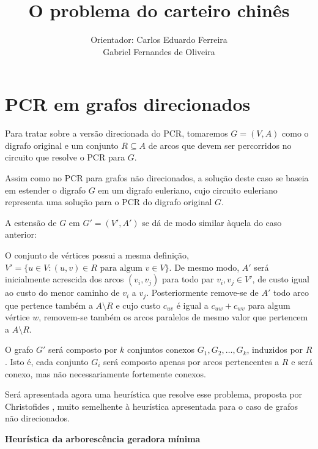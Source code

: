 \documentclass[12pt, a4paper]{article}
\title{O problema do carteiro chinês}
\author{Orientador: Carlos Eduardo Ferreira\\Gabriel Fernandes de Oliveira}
\date{}
\begin{document}
        \section{PCR em grafos direcionados}

        Para tratar sobre a versão direcionada do PCR, tomaremos $G = (V, A)$ como o digrafo original e um conjunto $R \subseteq A$ de arcos que devem ser percorridos no circuito que resolve o PCR para $G$.

        Assim como no PCR para grafos não direcionados, a solução deste caso se baseia em estender o digrafo $G$ em um digrafo euleriano, cujo circuito euleriano representa uma solução para o PCR do digrafo original $G$.

        A estensão de $G$ em $G' = (V', A')$ se dá de modo similar àquela do caso anterior:

        O conjunto de vértices possui a mesma definição, $V' = \{u \in V : (u, v) \in R \text{ para algum } v \in V\}$. 
        De mesmo modo, $A'$ será inicialmente acrescida dos arcos $(v_i, v_j)$ para todo par $v_i, v_j \in V'$, de custo igual ao custo do menor caminho de $v_i$ a $v_j$.
        Posteriormente remove-se de $A'$ todo arco que pertence também a $A \setminus R$ e cujo custo $c_{uv}$ é igual a $c_{uw} + c_{wv}$ para algum vértice $w$, removem-se também os arcos paralelos de mesmo valor que pertencem a $A \setminus R$.

		O grafo $G'$ será composto por $k$ conjuntos conexos $G_1, G_2, \dots, G_k$, induzidos por $R$. 
		Isto é, cada conjunto $G_i$ será composto apenas por arcos pertencentes a $R$ e será conexo, mas não necessariamente fortemente conexos.

        Será apresentada agora uma heurística que resolve esse problema, proposta por Christofides \cite{christofides-86}, muito semelhente à heurística apresentada para o caso de grafos não direcionados.

	\textbf{Heurística da arborescência geradora mínima}
\end{document}
